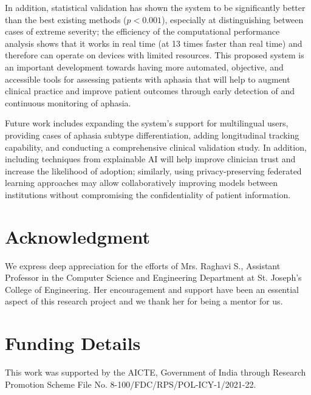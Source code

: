 \documentclass[conference]{IEEEtran}
\begin{document}
In addition, statistical validation has shown the system to be significantly better than the best existing methods ($p < 0.001$), especially at distinguishing between cases of extreme severity; the efficiency of the computational performance analysis shows that it works in real time (at 13 times faster than real time) and therefore can operate on devices with limited resources. This proposed system is an important development towards having more automated, objective, and accessible tools for assessing patients with aphasia that will help to augment clinical practice and improve patient outcomes through early detection of and continuous monitoring of aphasia.

Future work includes expanding the system's support for multilingual users, providing cases of aphasia subtype differentiation, adding longitudinal tracking capability, and conducting a comprehensive clinical validation study. In addition, including techniques from explainable AI will help improve clinician trust and increase the likelihood of adoption; similarly, using privacy-preserving federated learning approaches may allow collaboratively improving models between institutions without compromising the confidentiality of patient information.


\section*{Acknowledgment}

We express deep appreciation for the efforts of Mrs. Raghavi S., Assistant Professor in the Computer Science and Engineering Department at St. Joseph’s College of Engineering. Her encouragement and support have been an essential aspect of this research project and we thank her for being a mentor for us.

\section{Funding Details}

This work was supported by the AICTE, Government of India through Research Promotion Scheme File No. 8-100/FDC/RPS/POL-ICY-1/2021-22.
\end{document}
